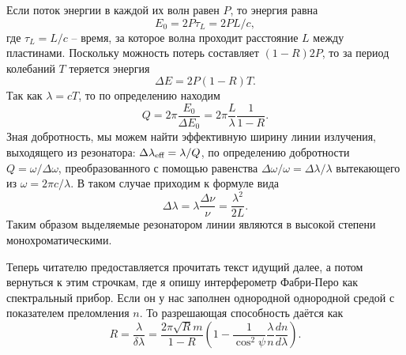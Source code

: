 Если поток энергии в каждой их волн равен $P$, то энергия равна 
\begin{equation*}
    E_0 = 2 P \tau_L = 2 P L/c,
\end{equation*}
где $\tau_L = L/c$ -- время, за которое волна проходит расстояние $L$ между пластинами. Поскольку можность потерь составляет $(1-R) 2 P$, то за период колебаний $T$ теряется энергия 
\begin{equation*}
    \Delta E = 2 P (1-R) T.
\end{equation*}
Так как $\lambda = c T$, то по определению находим
\begin{equation*}
    Q = 2 \pi \frac{E_0}{\Delta E_0} = 2 \pi \frac{L}{\lambda} \frac{1}{1-R}.
\end{equation*}
Зная добротность, мы можем найти эффективную ширину линии излучения, выходящего из резонатора:
$\Delta \lambda_{\textnormal{eff}} = \lambda/Q$, по определению добротности $Q = \omega / \Delta \omega$, преобразованного с помощью равенства $\Delta \omega/\omega = \Delta \lambda/\lambda$ вытекающего из $\omega = 2 \pi c / \lambda$. В таком случае приходим к формуле вида
\begin{equation*}
    \Delta \lambda = \lambda \frac{\Delta \nu}{\nu} = \frac{\lambda^2}{2L}.
\end{equation*}
Таким образом выделяемые резонатором линии являются в высокой степени монохроматическими. 

Теперь читателю предоставляется прочитать текст идущий далее, а потом вернуться к этим строчкам, где я опишу интерферометр Фабри-Перо как спектральный прибор.
Если он у нас заполнен однородной однородной средой с показателем преломления $n$. То разрешающая способность даётся как
\begin{equation*}
    R = \frac{\lambda}{\delta\lambda} = \frac{2 \pi \sqrt{R} m}{1 - R}\left(1 - \frac{1}{\cos^2 \psi} \frac{\lambda}{n} \frac{d n}{d \lambda}\right).
\end{equation*}